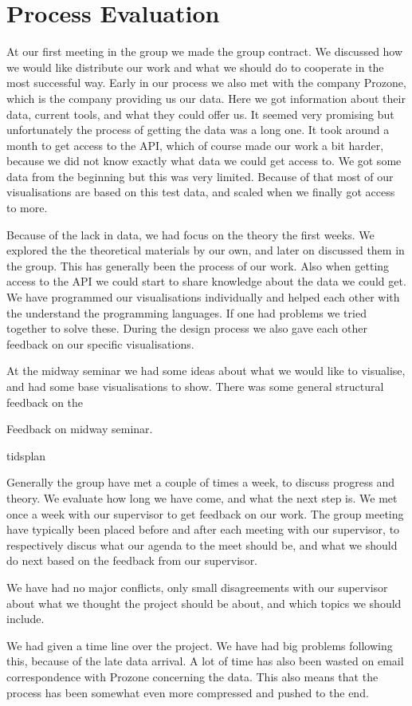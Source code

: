 \documentclass[Report.tex]{subfiles}
\begin{document}
\section{Process Evaluation}
At our first meeting in the group we made the group contract. We discussed how we would like distribute our work and what we should do to cooperate in the most successful way. Early in our process we also met with the company Prozone, which is the company providing us our data. Here we got information about their data, current tools, and what they could offer us. It seemed very promising but unfortunately the process of getting the data was a long one. It took around a month to get access to the API, which of course made our work a bit harder, because we did not know exactly what data we could get access to. We got some data from the beginning but this was very limited. Because of that most of our visualisations are based on this test data, and scaled when we finally got access to more.

Because of the lack in data, we had focus on the theory the first weeks. We explored the the theoretical materials by our own, and later on discussed them in the group. This has generally been the process of our work. Also when getting access to the API we could start to share knowledge about the data we could get. We have programmed our visualisations individually and helped each other with the understand the programming languages. If one had problems we tried together to solve these. During the design process we also gave each other feedback on our specific visualisations. 

At the midway seminar we had some ideas about what we would like to visualise, and had some base visualisations to show. There was some general structural feedback on the 

Feedback on midway seminar. 

tidsplan 

Generally the group have met a couple of times a week, to discuss progress and theory. We evaluate how long we have come, and what the next step is. We met once a week with our supervisor to get feedback on our work. The group meeting have typically been placed before and after each meeting with our supervisor, to respectively discus what our agenda to the meet should be, and what we should do next based on the feedback from our supervisor.

We have had no major conflicts, only small disagreements with our supervisor about what we thought the project should be about, and which topics we should include.

We had given a time line over the project. We have had big problems following this, because of the late data arrival. A lot of time has also been wasted on email correspondence with Prozone concerning the data. This also means that the process has been somewhat even more compressed and pushed to the end. 
\end{document}
